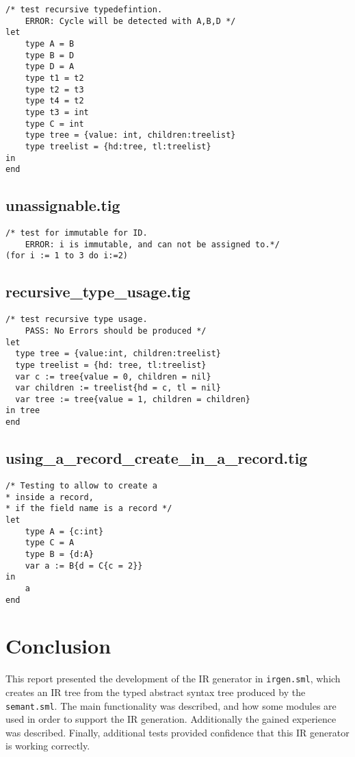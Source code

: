 \documentclass{article}
\begin{document}
\begin{lstlisting}[frame=single]
/* test recursive typedefintion.
	ERROR: Cycle will be detected with A,B,D */
let
	type A = B
	type B = D
	type D = A
	type t1 = t2
	type t2 = t3
	type t4 = t2
	type t3 = int
	type C = int
	type tree = {value: int, children:treelist}
	type treelist = {hd:tree, tl:treelist}
in 
end
\end{lstlisting}

\subsection{unassignable.tig}

\begin{lstlisting}[frame=single]
/* test for immutable for ID.
	ERROR: i is immutable, and can not be assigned to.*/
(for i := 1 to 3 do i:=2)
\end{lstlisting}

\subsection{recursive\_type\_usage.tig}

\begin{lstlisting}[frame=single]
 /* test recursive type usage.
	PASS: No Errors should be produced */
let
  type tree = {value:int, children:treelist}
  type treelist = {hd: tree, tl:treelist}
  var c := tree{value = 0, children = nil}
  var children := treelist{hd = c, tl = nil}
  var tree := tree{value = 1, children = children}
in tree
end
\end{lstlisting}

\subsection{using\_a\_record\_create\_in\_a\_record.tig}

\begin{lstlisting}[frame=single]
/* Testing to allow to create a
* inside a record,
* if the field name is a record */
let
	type A = {c:int}
	type C = A
	type B = {d:A}
	var a := B{d = C{c = 2}}
in
	a
end
\end{lstlisting}


\section{Conclusion}
This report presented the development of the IR generator in \texttt{irgen.sml}, which creates an IR tree from the typed abstract syntax tree produced by the \texttt{semant.sml}. The main functionality was described, and how some modules are used in order to support the IR generation. Additionally the gained experience was described. Finally, additional tests provided confidence that this IR generator is working correctly.
\end{document}
